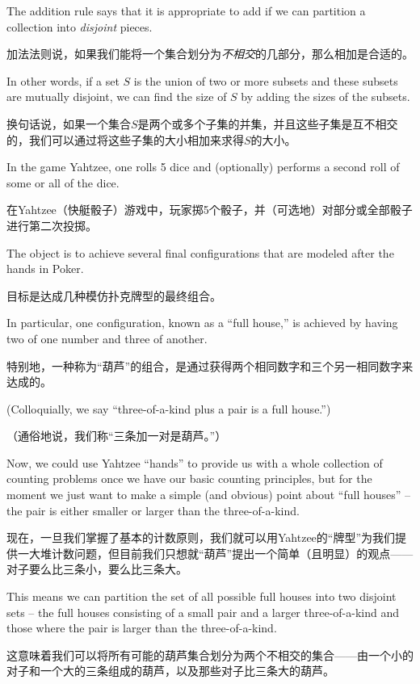 The addition rule says that it is appropriate to add if we can 
partition a collection into \emph{disjoint} pieces.

加法法则说，如果我们能将一个集合划分为\emph{不相交}的几部分，那么相加是合适的。

In other words,
if a set $S$ is the union of two or more subsets and these subsets 
are mutually disjoint, we can find the size of $S$ by adding the sizes
of the subsets.

换句话说，如果一个集合$S$是两个或多个子集的并集，并且这些子集是互不相交的，我们可以通过将这些子集的大小相加来求得$S$的大小。

In the game Yahtzee, one rolls 5 dice and (optionally) performs a 
second roll of some or all of the dice.

在Yahtzee（快艇骰子）游戏中，玩家掷5个骰子，并（可选地）对部分或全部骰子进行第二次投掷。

The object is to achieve 
several final configurations that are modeled after the hands in
Poker.

目标是达成几种模仿扑克牌型的最终组合。

In particular, one configuration, known as a ``full house,''
is achieved by having two of one number and three of another.

特别地，一种称为“葫芦”的组合，是通过获得两个相同数字和三个另一相同数字来达成的。

(Colloquially, we say ``three-of-a-kind plus a pair is a full house.'')

（通俗地说，我们称“三条加一对是葫芦。”）

Now, we could use Yahtzee ``hands'' to provide us with a whole collection
of counting problems once we have our basic counting principles,
but for the moment we just want to make a simple (and obvious) point
about ``full houses'' -- the pair is either smaller or larger than
the three-of-a-kind.

现在，一旦我们掌握了基本的计数原则，我们就可以用Yahtzee的“牌型”为我们提供一大堆计数问题，但目前我们只想就“葫芦”提出一个简单（且明显）的观点——对子要么比三条小，要么比三条大。

This means we can partition the set of all possible
full houses into two disjoint sets -- the full houses consisting of a small
pair and a larger three-of-a-kind and those where the pair is larger 
than the three-of-a-kind.

这意味着我们可以将所有可能的葫芦集合划分为两个不相交的集合——由一个小的对子和一个大的三条组成的葫芦，以及那些对子比三条大的葫芦。

